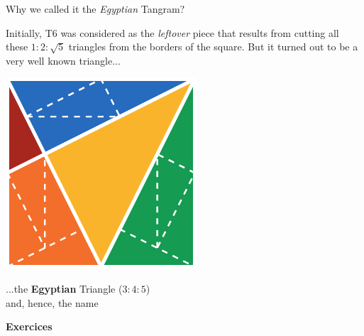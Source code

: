 \documentclass[14pt]{beamer}
\begin{document}
    \begin{frame}{Why we called it the \emph{Egyptian} Tangram?}
        \begin{center}
            {\small Initially, T6 was considered as the \emph{leftover} piece that results from cutting all these $1\!:\!2\!:\!\sqrt{5}$ triangles from the borders of the square. But it turned out to be a very well known triangle...}
            
            \bigskip \bigskip

            \includegraphics[height=15ex]{figures/figure003a.pdf} \\

            \bigskip \bigskip

            ...the \textbf{Egyptian} Triangle ($3\!:\!4\!:\!5$)\\{\small and, hence, the name}
        \end{center}
    \end{frame}


    \begin{frame}{}
        \begin{center}
            \textbf{\Huge Exercices}\\
        \end{center}
    \end{frame}

\end{document}
